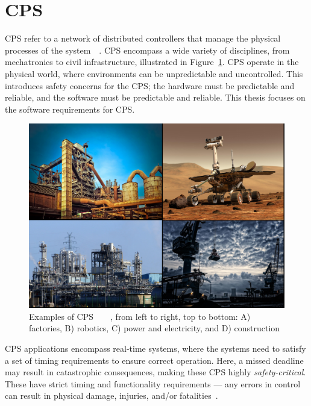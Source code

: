 \section{\acf{CPS}}
\acf{CPS} refer to a network of distributed controllers that manage the physical processes of the system~\cite{cps-design}~\cite{alur2015principles}. 
\ac{CPS} encompass a wide variety of disciplines, from mechatronics to civil infrastructure, illustrated in Figure~\ref{fig:cps}.
\ac{CPS} operate in the physical world, where environments can be unpredictable and uncontrolled.
This introduces safety concerns for the \ac{CPS}; the hardware must be predictable and reliable, and the software must be predictable and reliable.
This thesis focuses on the software requirements for \ac{CPS}.

\begin{figure}[H]
	\centering
	\includegraphics[width=\textwidth]{Content/fig/1234.pdf}
	\caption{Examples of \ac{CPS}~\cite{industry-pic}~\cite{crane-pic}~\cite{rover-pic}~\cite{factory-pic}, from left to right, top to bottom: A) factories, B) robotics, C) power and electricity, and D) construction \label{fig:cps}}
\end{figure}

\ac{CPS} applications encompass real-time systems, where the systems need to satisfy a set of timing requirements to ensure correct operation. 
Here, a missed deadline may result in catastrophic consequences, making these \ac{CPS} highly \textit{safety-critical}. 
These have strict timing and functionality requirements --- any errors in control can result in physical damage, injuries, and/or fatalities~\cite{ANNDevModel1999}. 


